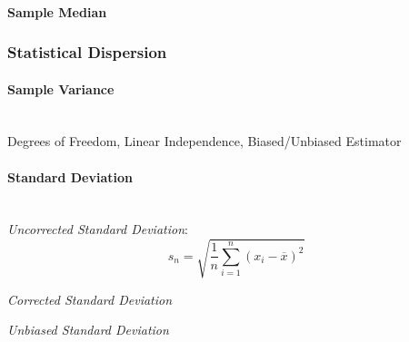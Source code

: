 \paragraph{Sample Median}\label{sec:median}



\subsubsection{Statistical Dispersion}\label{sec:statistical_dispersion}

\paragraph{Sample Variance}\label{sec:variability}
\hfill \\

Degrees of Freedom, Linear Independence, Biased/Unbiased Estimator %



\paragraph{Standard Deviation}\label{sec:standard_deviation}
\hfill \\

\emph{Uncorrected Standard Deviation}:
\[
  s_n = \sqrt{\frac{1}{n}\sum_{i=1}^n (x_i - \overline{x})^2}
\]

\emph{Corrected Standard Deviation}

\emph{Unbiased Standard Deviation}
